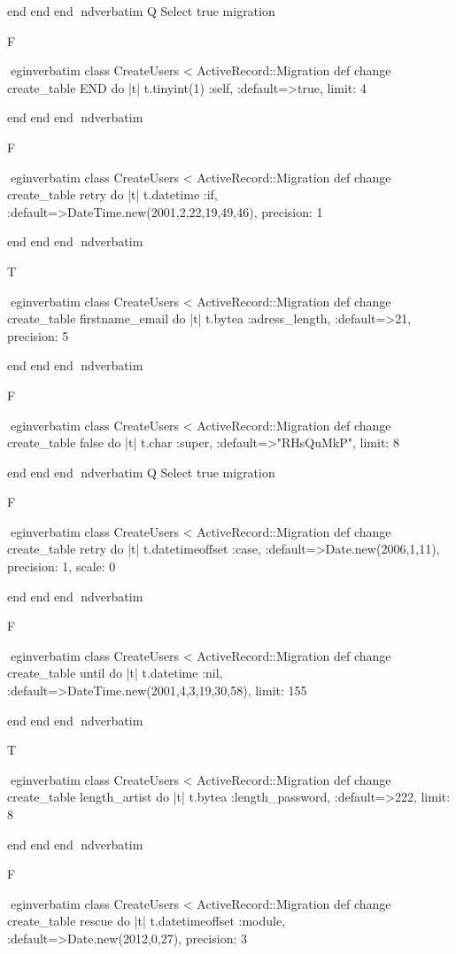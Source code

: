     end 
  end 
end
nd{verbatim}
Q
 Select true migration

F

egin{verbatim}
 class CreateUsers < ActiveRecord::Migration 
  def change 
    create_table END do |t| 
      t.tinyint(1) :self, :default=>true, limit: 4
    
    end 
  end 
end
nd{verbatim}

F

egin{verbatim}
 class CreateUsers < ActiveRecord::Migration 
  def change 
    create_table retry do |t| 
      t.datetime :if, :default=>DateTime.new(2001,2,22,19,49,46), precision: 1
    
    end 
  end 
end
nd{verbatim}

T

egin{verbatim}
 class CreateUsers < ActiveRecord::Migration 
  def change 
    create_table firstname_email do |t| 
      t.bytea :adress_length, :default=>21, precision: 5
    
    end 
  end 
end
nd{verbatim}

F

egin{verbatim}
 class CreateUsers < ActiveRecord::Migration 
  def change 
    create_table false do |t| 
      t.char :super, :default=>"RHsQuMkP", limit: 8
    
    end 
  end 
end
nd{verbatim}
Q
 Select true migration

F

egin{verbatim}
 class CreateUsers < ActiveRecord::Migration 
  def change 
    create_table retry do |t| 
      t.datetimeoffset :case, :default=>Date.new(2006,1,11), precision: 1, scale: 0
    
    end 
  end 
end
nd{verbatim}

F

egin{verbatim}
 class CreateUsers < ActiveRecord::Migration 
  def change 
    create_table until do |t| 
      t.datetime :nil, :default=>DateTime.new(2001,4,3,19,30,58), limit: 155
    
    end 
  end 
end
nd{verbatim}

T

egin{verbatim}
 class CreateUsers < ActiveRecord::Migration 
  def change 
    create_table length_artist do |t| 
      t.bytea :length_password, :default=>222, limit: 8
    
    end 
  end 
end
nd{verbatim}

F

egin{verbatim}
 class CreateUsers < ActiveRecord::Migration 
  def change 
    create_table rescue do |t| 
      t.datetimeoffset :module, :default=>Date.new(2012,0,27), precision: 3
    
